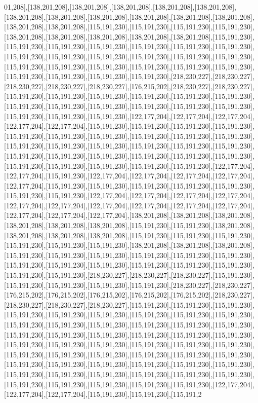 01,208],[138,201,208],[138,201,208],[138,201,208],[138,201,208],[138,201,208],[138,201,208],[138,201,208],[138,201,208],[138,201,208],[138,201,208],[138,201,208],[138,201,208],[138,201,208],[115,191,230],[115,191,230],[115,191,230],[115,191,230],[138,201,208],[138,201,208],[138,201,208],[138,201,208],[138,201,208],[115,191,230],[115,191,230],[115,191,230],[115,191,230],[115,191,230],[115,191,230],[115,191,230],[115,191,230],[115,191,230],[115,191,230],[115,191,230],[115,191,230],[115,191,230],[115,191,230],[115,191,230],[115,191,230],[115,191,230],[115,191,230],[115,191,230],[115,191,230],[115,191,230],[115,191,230],[115,191,230],[218,230,227],[218,230,227],[218,230,227],[218,230,227],[218,230,227],[176,215,202],[218,230,227],[218,230,227],[115,191,230],[115,191,230],[115,191,230],[115,191,230],[115,191,230],[115,191,230],[115,191,230],[115,191,230],[115,191,230],[115,191,230],[115,191,230],[115,191,230],[115,191,230],[115,191,230],[115,191,230],[122,177,204],[122,177,204],[122,177,204],[122,177,204],[122,177,204],[115,191,230],[115,191,230],[115,191,230],[115,191,230],[115,191,230],[115,191,230],[115,191,230],[115,191,230],[115,191,230],[115,191,230],[115,191,230],[115,191,230],[115,191,230],[115,191,230],[115,191,230],[115,191,230],[115,191,230],[115,191,230],[115,191,230],[115,191,230],[115,191,230],[115,191,230],[115,191,230],[115,191,230],[115,191,230],[115,191,230],[115,191,230],[122,177,204],[122,177,204],[115,191,230],[122,177,204],[122,177,204],[122,177,204],[122,177,204],[122,177,204],[115,191,230],[115,191,230],[115,191,230],[115,191,230],[115,191,230],[115,191,230],[115,191,230],[122,177,204],[122,177,204],[122,177,204],[122,177,204],[122,177,204],[122,177,204],[122,177,204],[122,177,204],[122,177,204],[122,177,204],[122,177,204],[122,177,204],[122,177,204],[138,201,208],[138,201,208],[138,201,208],[138,201,208],[138,201,208],[138,201,208],[115,191,230],[115,191,230],[138,201,208],[138,201,208],[138,201,208],[138,201,208],[115,191,230],[115,191,230],[115,191,230],[115,191,230],[115,191,230],[115,191,230],[138,201,208],[138,201,208],[138,201,208],[115,191,230],[115,191,230],[115,191,230],[115,191,230],[115,191,230],[115,191,230],[115,191,230],[115,191,230],[115,191,230],[115,191,230],[115,191,230],[115,191,230],[115,191,230],[115,191,230],[218,230,227],[218,230,227],[218,230,227],[115,191,230],[115,191,230],[115,191,230],[115,191,230],[115,191,230],[218,230,227],[218,230,227],[176,215,202],[176,215,202],[176,215,202],[176,215,202],[176,215,202],[218,230,227],[218,230,227],[218,230,227],[218,230,227],[115,191,230],[115,191,230],[115,191,230],[115,191,230],[115,191,230],[115,191,230],[115,191,230],[115,191,230],[115,191,230],[115,191,230],[115,191,230],[115,191,230],[115,191,230],[115,191,230],[115,191,230],[115,191,230],[115,191,230],[115,191,230],[115,191,230],[115,191,230],[115,191,230],[115,191,230],[115,191,230],[115,191,230],[115,191,230],[115,191,230],[115,191,230],[115,191,230],[115,191,230],[115,191,230],[115,191,230],[115,191,230],[115,191,230],[115,191,230],[115,191,230],[115,191,230],[115,191,230],[115,191,230],[115,191,230],[115,191,230],[115,191,230],[115,191,230],[115,191,230],[115,191,230],[115,191,230],[115,191,230],[115,191,230],[115,191,230],[115,191,230],[115,191,230],[122,177,204],[122,177,204],[122,177,204],[115,191,230],[115,191,230],[115,191,2